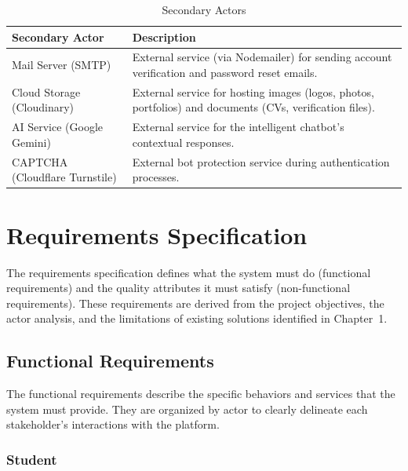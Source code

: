 \begin{table}[H]
\centering
\caption{Secondary Actors}
\label{tab:secondary-actors}
\begin{tabular}{|p{4cm}|p{10cm}|}
\hline
\textbf{Secondary Actor} & \textbf{Description} \\
\hline
Mail Server (SMTP) & External service (via Nodemailer) for sending account verification and password reset emails. \\
\hline
Cloud Storage (Cloudinary) & External service for hosting images (logos, photos, portfolios) and documents (CVs, verification files). \\
\hline
AI Service (Google Gemini) & External service for the intelligent chatbot's contextual responses. \\
\hline
CAPTCHA (Cloudflare Turnstile) & External bot protection service during authentication processes. \\
\hline
\end{tabular}
\end{table}

\section{Requirements Specification}

The requirements specification defines what the system must do (functional requirements) and the quality attributes it must satisfy (non-functional requirements). These requirements are derived from the project objectives, the actor analysis, and the limitations of existing solutions identified in Chapter~1.

\subsection{Functional Requirements}

The functional requirements describe the specific behaviors and services that the system must provide. They are organized by actor to clearly delineate each stakeholder's interactions with the platform.

\subsubsection{Student}

